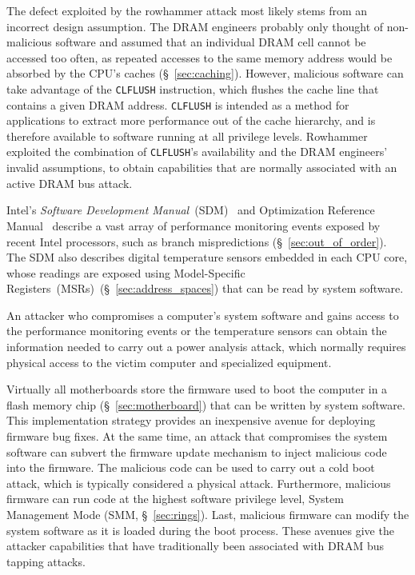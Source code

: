 The defect exploited by the rowhammer attack most likely stems from an incorrect
design assumption. The DRAM engineers probably only thought of non-malicious
software and assumed that an individual DRAM cell cannot be accessed too
often, as repeated accesses to the same memory address would be absorbed by the
CPU's caches (\S~\ref{sec:caching}). However, malicious software can take
advantage of the \texttt{CLFLUSH} instruction, which flushes the cache line
that contains a given DRAM address. \texttt{CLFLUSH} is intended as a method
for applications to extract more performance out of the cache hierarchy, and
is therefore available to software running at all privilege levels. Rowhammer
exploited the combination of \texttt{CLFLUSH}'s availability and the DRAM
engineers' invalid assumptions, to obtain capabilities that are normally
associated with an active DRAM bus attack.


\label{sec:perfmon_attacks}


Intel's \textit{Software Development Manual}~(SDM)~\cite{intel2015sdm} and
Optimization Reference Manual~\cite{intel2014optimization} describe a vast
array of performance monitoring events exposed by recent Intel processors,
such as branch mispredictions (\S~\ref{sec:out_of_order}). The SDM also
describes digital temperature sensors embedded in each CPU core, whose readings
are exposed using Model-Specific Registers~(MSRs)~(\S~\ref{sec:address_spaces})
that can be read by system software.

An attacker who compromises a computer's system software and gains access to
the performance monitoring events or the temperature sensors can obtain the
information needed to carry out a power analysis attack, which normally
requires physical access to the victim computer and specialized equipment.


\label{sec:firmware_attacks}

Virtually all motherboards store the firmware used to boot the computer in a
flash memory chip (\S~\ref{sec:motherboard}) that can be written by system
software. This implementation strategy provides an inexpensive avenue for
deploying firmware bug fixes. At the same time, an attack that compromises the
system software can subvert the firmware update mechanism to inject malicious
code into the firmware. The malicious code can be used to carry out a cold boot
attack, which is typically considered a physical attack. Furthermore, malicious
firmware can run code at the highest software privilege level, System
Management Mode (SMM, \S~\ref{sec:rings}). Last, malicious firmware can modify
the system software as it is loaded during the boot process. These avenues give
the attacker capabilities that have traditionally been associated with DRAM bus
tapping attacks.

